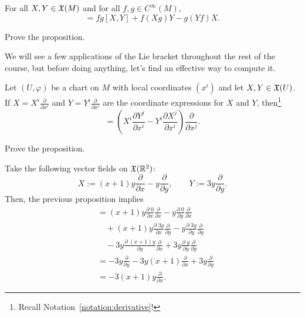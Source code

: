\begin{proposition}
	For all $X, Y \in \mathfrak{X}(M)$ and for all $f,g\in C^\infty(M)$,
	\begin{equation}
		[fX, gY] = fg[X,Y] + f(Xg)Y - g(Yf)X.
	\end{equation}
\end{proposition}
\begin{exercise}
	Prove the proposition.
\end{exercise}

We will see a few applications of the Lie bracket throughout the rest of the course, but before doing anything, let's find an effective way to compute it.

\begin{proposition}
	Let $(U, \varphi)$ be a chart on $M$ with local coordinates $(x^i)$ and let $X,Y\in\mathfrak{X}(U)$.
	If $X = X^i \frac{\partial }{\partial x^i}$ and $Y = Y^i \frac{\partial}{\partial x^i}$ are the coordinate expressions for $X$ and $Y$, then\footnote{Recall Notation~\ref{notation:derivative}!}
	\begin{equation}
		[X,Y] = \left(X^i\frac{\partial Y^j}{\partial x^i} - Y^i\frac{\partial X^j}{\partial x^i}\right)\frac{\partial}{\partial x^j}.
	\end{equation}
\end{proposition}
\begin{exercise}
	Prove the proposition.
\end{exercise}

\begin{example}
	Take the following vector fields on $\mathfrak{X}(\mathbb{R}^2)$:
	\begin{equation}
		X := (x+1)y \frac{\partial}{\partial x} - y \frac{\partial}{\partial y},\qquad
		Y := 3y \frac{\partial}{\partial y}.
	\end{equation}
	Then, the previous proposition implies
	\begin{align}
		[X,Y]
		 & = (x+1)y  \frac{\partial\; 0}{\partial x} \frac{\partial}{\partial x} - y \frac{\partial\; 0}{\partial y} \frac{\partial}{\partial x}         \\
		 & \quad + (x+1)y  \frac{\partial\; 3y}{\partial x} \frac{\partial}{\partial y} - y \frac{\partial\; 3y}{\partial y} \frac{\partial}{\partial y} \\
		 & \quad - 3y \frac{\partial\; (x+1)y}{\partial y} \frac{\partial}{\partial x} + 3y \frac{\partial\; y}{\partial y} \frac{\partial}{\partial y}  \\
		 & = - 3y \frac{\partial}{\partial y} -3 y(x+1) \frac{\partial}{\partial x} + 3y \frac{\partial}{\partial y}                                     \\
		 & = -3(x+1)y \frac{\partial}{\partial x}.
	\end{align}
\end{example}

